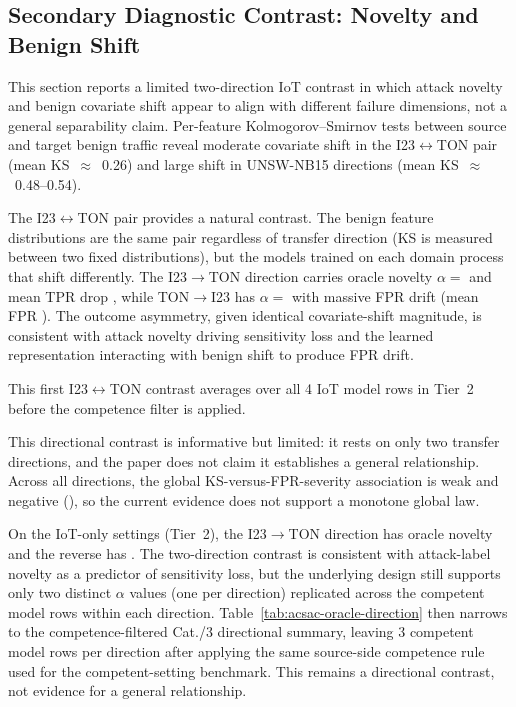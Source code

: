 \documentclass[10pt,conference]{IEEEtran}
\begin{document}
\FloatBarrier

\subsection{Secondary Diagnostic Contrast: Novelty and Benign Shift}
\label{sec:covariate-shift}

This section reports a limited two-direction IoT contrast in which attack novelty and benign covariate shift appear to align with different failure dimensions, not a general separability claim. Per-feature Kolmogorov--Smirnov tests between source and target benign traffic reveal moderate covariate shift in the I23$\leftrightarrow$TON pair (mean KS~$\approx$~0.26) and large shift in UNSW-NB15 directions (mean KS~$\approx$~0.48--0.54).

The I23$\leftrightarrow$TON pair provides a natural contrast. The benign feature distributions are the same pair regardless of transfer direction (KS is measured between two fixed distributions), but the models trained on each domain process that shift differently. The I23$\to$TON direction carries oracle novelty $\alpha = $ \IotToTonOracleAlpha{} and mean TPR drop \IotToTonMeanRelativeTprDrop{}, while TON$\to$I23 has $\alpha = $ \TonToIotOracleAlpha{} with massive FPR drift (mean FPR \TonToIotMeanRealizedFpr{}). The outcome asymmetry, given identical covariate-shift magnitude, is consistent with attack novelty driving sensitivity loss and the learned representation interacting with benign shift to produce FPR drift.

This first I23$\leftrightarrow$TON contrast averages over all 4 IoT model rows in Tier~2 before the competence filter is applied.

This directional contrast is informative but limited: it rests on only two transfer directions, and the paper does not claim it establishes a general relationship. Across all \DirectionCount{} directions, the global KS-versus-FPR-severity association is weak and negative (\DirectionBenignKsFprSeveritySpearman{}), so the current evidence does not support a monotone global law.



On the \PrimaryIotSettingCount{} IoT-only settings (Tier~2), the I23$\to$TON direction has oracle novelty \IotToTonOracleAlpha{} and the reverse has \TonToIotOracleAlpha{}. The two-direction contrast is consistent with attack-label novelty as a predictor of sensitivity loss, but the underlying design still supports only two distinct $\alpha$ values (one per direction) replicated across the competent model rows within each direction. Table~\ref{tab:acsac-oracle-direction} then narrows to the competence-filtered Cat./3 directional summary, leaving 3 competent model rows per direction after applying the same source-side competence rule used for the competent-setting benchmark. This remains a directional contrast, not evidence for a general relationship.
\end{document}
